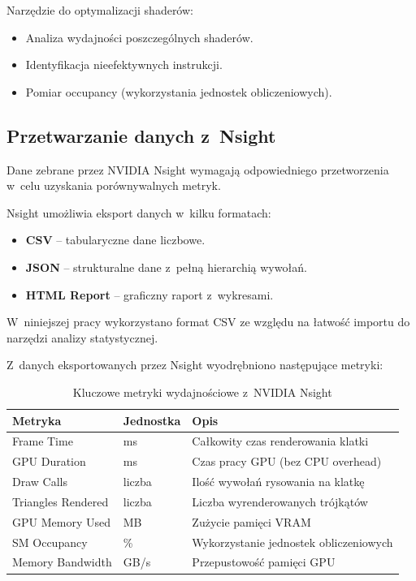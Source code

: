 Narzędzie do optymalizacji shaderów:
\begin{itemize}
    \item Analiza wydajności poszczególnych shaderów.
    \item Identyfikacja nieefektywnych instrukcji.
    \item Pomiar occupancy (wykorzystania jednostek obliczeniowych).
\end{itemize}

\subsection{Przetwarzanie danych z~Nsight}
\label{subsec:przetwarzanie-nsight}

Dane zebrane przez NVIDIA Nsight wymagają odpowiedniego przetworzenia w~celu uzyskania porównywalnych metryk.


Nsight umożliwia eksport danych w~kilku formatach:
\begin{itemize}
    \item \textbf{CSV} -- tabularyczne dane liczbowe.
    \item \textbf{JSON} -- strukturalne dane z~pełną hierarchią wywołań.
    \item \textbf{HTML Report} -- graficzny raport z~wykresami.
\end{itemize}

W~niniejszej pracy wykorzystano format CSV ze względu na łatwość importu do narzędzi analizy statystycznej.


Z~danych eksportowanych przez Nsight wyodrębniono następujące metryki:

\begin{table}[H]
\centering
\caption{Kluczowe metryki wydajnościowe z~NVIDIA Nsight}
\label{tab:metryki-nsight}
\begin{tabular}{|>{\raggedright\arraybackslash}p{4cm}|>{\raggedright\arraybackslash}p{3cm}|>{\raggedright\arraybackslash}p{5.5cm}|}
\hline
\textbf{Metryka} & \textbf{Jednostka} & \textbf{Opis} \\
\hline
Frame Time & ms & Całkowity czas renderowania klatki \\
\hline
GPU Duration & ms & Czas pracy GPU (bez CPU overhead) \\
\hline
Draw Calls & liczba & Ilość wywołań rysowania na klatkę \\
\hline
Triangles Rendered & liczba & Liczba wyrenderowanych trójkątów \\
\hline
GPU Memory Used & MB & Zużycie pamięci VRAM \\
\hline
SM Occupancy & \% & Wykorzystanie jednostek obliczeniowych \\
\hline
Memory Bandwidth & GB/s & Przepustowość pamięci GPU \\
\hline
\end{tabular}
\end{table}

